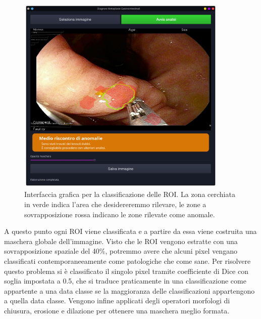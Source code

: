 \begin{figure}[h]
    \center
    \includegraphics[width=0.9\textwidth]{./assets/gui-one.png}
    \caption{\label{fig:gui-one}Interfaccia grafica per la classificazione delle ROI. La zona cerchiata in verde indica l'area che desidereremmo rilevare, le zone a sovrapposizione rossa indicano le zone rilevate come anomale.}
\end{figure}

A questo punto ogni ROI viene classificata e a partire da essa viene
costruita una maschera globale dell'immagine.
Visto che le ROI vengono estratte con una sovrapposizione spaziale del 40\%,
potremmo avere che alcuni pixel vengano classificati contemporaneeamente
come patologiche che come sane.
Per risolvere questo problema si è classificato il singolo pixel tramite
coefficiente di Dice con soglia impostata a 0.5, che si traduce
praticamente in una classificazione come appartente a una data classe
se la maggioranza delle classificazioni appartengono a quella data classe.
Vengono infine applicati degli operatori morfologi di chiusura, erosione e dilazione
per ottenere una maschera meglio formata.

